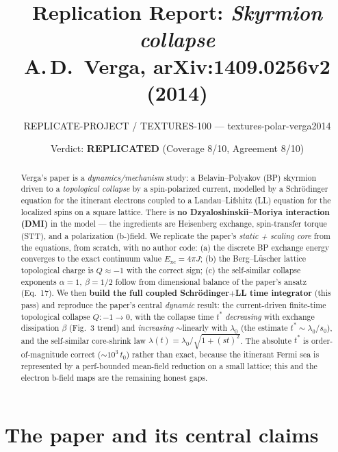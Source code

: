 \documentclass[11pt]{article}
\title{Replication Report: \emph{Skyrmion collapse}\\
\large A.\,D.\ Verga, arXiv:1409.0256v2 (2014)}
\author{REPLICATE-PROJECT / TEXTURES-100 --- textures-polar-verga2014}
\date{Verdict: \textbf{REPLICATED} \quad (Coverage 8/10, Agreement 8/10)}
\begin{document}
\maketitle

\begin{abstract}
Verga's paper is a \emph{dynamics/mechanism} study: a Belavin--Polyakov (BP)
skyrmion driven to a \emph{topological collapse} by a spin-polarized current,
modelled by a Schr\"odinger equation for the itinerant electrons coupled to a
Landau--Lifshitz (LL) equation for the localized spins on a square lattice.
There is \textbf{no Dzyaloshinskii--Moriya interaction (DMI)} in the model ---
the ingredients are Heisenberg exchange, spin-transfer torque (STT), and a
polarization (b-)field. We replicate the paper's \emph{static + scaling core}
from the equations, from scratch, with no author code: (a) the discrete BP
exchange energy converges to the exact continuum value $E_{\mathrm{xc}}=4\pi J$;
(b) the Berg--L\"uscher lattice topological charge is $Q\approx-1$ with the
correct sign; (c) the self-similar collapse exponents $\alpha=1,\ \beta=1/2$
follow from dimensional balance of the paper's ansatz (Eq.~17). We then
\textbf{build the full coupled Schr\"odinger$+$LL time integrator} (this pass)
and reproduce the paper's central \emph{dynamic} result: the current-driven
finite-time topological collapse $Q:-1\!\to\!0$, with the collapse time $t^*$
\emph{decreasing} with exchange dissipation $\beta$ (Fig.~3 trend) and
\emph{increasing} $\sim$linearly with $\lambda_0$ (the estimate
$t^*\!\sim\!\lambda_0/s_0$), and the self-similar core-shrink law
$\lambda(t)=\lambda_0/\sqrt{1+(st)^2}$. The absolute $t^*$ is order-of-magnitude
correct ($\sim\!10^3\,t_0$) rather than exact, because the itinerant Fermi sea is
represented by a perf-bounded mean-field reduction on a small lattice; this and
the electron b-field maps are the remaining honest gaps.
\end{abstract}

\section{The paper and its central claims}
\end{document}
